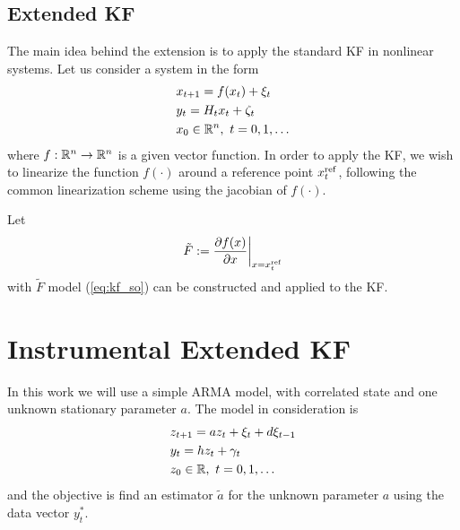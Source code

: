 \subsection{Extended KF}
The main idea behind the extension is to apply the standard KF in nonlinear systems. Let us consider a system in the form
\begin{equation}
  \begin{split}
    &x_{t+1}=f(x_t) + \xi_t\\
    &y_t=H_tx_t+\zeta_t\\
    &x_0\in{\mathbb{R}}^n, \ t=0,1,\dots
  \end{split}
\end{equation}
where $f:{\mathbb{R}}^n\rightarrow{\mathbb{R}}^n$ is a given vector function. In order to apply the KF, we wish to linearize the function $f(\cdot)$ around a reference point $x^{{\rm ref}}_t$, following the common linearization scheme using the jacobian of $f(\cdot)$.

Let
\[
\tilde{F}:=\dfrac{\partial f(x)}{\partial x}\bigg|_{x=x^{{\rm ref}}_t}
\]
with $\tilde{F}$ model (\ref{eq:kf_so}) can be constructed and applied to the KF.


\section{Instrumental Extended KF}\label{sec:IEKF}
In this work we will use a simple ARMA model, with correlated state and one unknown stationary parameter $a$. The model in consideration is
\begin{equation}
  \begin{split}
    &z_{t+1}=az_t+\xi_t+d\xi_{t-1}\\
    &y_{t}=hz_t+\gamma_{t}\\
    &z_0\in{\mathbb{R}}, \ t=0,1,\dots
  \end{split}
\end{equation}
and the objective is find an estimator $\tilde{a}$ for the unknown parameter $a$ using the data vector $y^*_t$.

